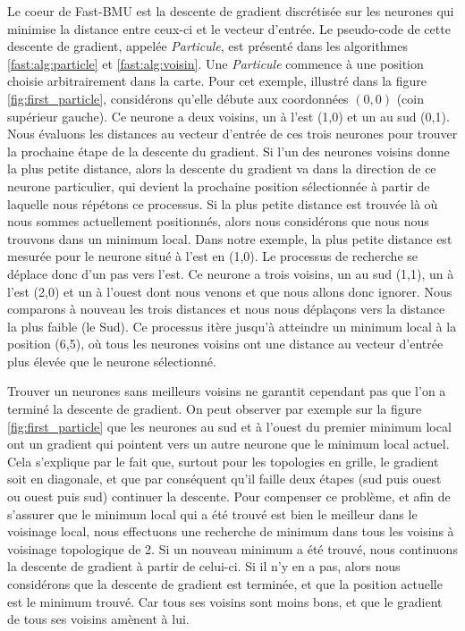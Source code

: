 	Le coeur de Fast-BMU est la descente de gradient discrétisée sur les neurones qui minimise la distance entre ceux-ci et le vecteur d'entrée. Le pseudo-code de cette descente de gradient, appelée \textit{Particule}, est présenté dans les algorithmes \ref{fast:alg:particle} et \ref{fast:alg:voisin}. Une \textit{Particule} commence à une position choisie arbitrairement dans la carte. Pour cet exemple, illustré dans la figure \ref{fig:first_particle}, considérons qu'elle débute aux coordonnées $(0,0)$ (coin supérieur gauche). Ce neurone a deux voisins, un à l'est (1,0) et un au sud (0,1). Nous évaluons les distances au vecteur d'entrée de ces trois neurones pour trouver la prochaine étape de la descente du gradient. Si l'un des neurones voisins donne la plus petite distance, alors la descente du gradient va dans la direction de ce neurone particulier, qui devient la prochaine position sélectionnée à partir de laquelle nous répétons ce processus. Si la plus petite distance est trouvée là où nous sommes actuellement positionnés, alors nous considérons que nous nous trouvons dans un minimum local. Dans notre exemple, la plus petite distance est mesurée pour le neurone situé à l'est en (1,0). Le processus de recherche se déplace donc d'un pas vers l'est. Ce neurone a trois voisins, un au sud (1,1), un à l'est (2,0) et un à l'ouest dont nous venons et que nous allons donc ignorer. Nous comparons à nouveau les trois distances et nous nous déplaçons vers la distance la plus faible (le Sud). Ce processus itère jusqu'à atteindre un minimum local à la position (6,5), où tous les neurones voisins ont une distance au vecteur d'entrée plus élevée que le neurone sélectionné.

	Trouver un neurones sans meilleurs voisins ne garantit cependant pas que l'on a terminé la descente de gradient. On peut observer par exemple sur la figure \ref{fig:first_particle} que les neurones au sud et à l'ouest du premier minimum local ont un gradient qui pointent vers un autre neurone que le minimum local actuel. Cela s'explique par le fait que, surtout pour les topologies en grille, le gradient soit en diagonale, et que par conséquent qu'il faille deux étapes (sud puis ouest ou ouest puis sud) continuer la descente. Pour compenser ce problème, et afin de s'assurer que le minimum local qui a été trouvé est bien le meilleur dans le voisinage local, nous effectuons une recherche de minimum dans tous les voisins à voisinage topologique de 2. Si un nouveau minimum a été trouvé, nous continuons la descente de gradient à partir de celui-ci. Si il n'y en a pas, alors nous considérons que la descente de gradient est terminée, et que la position actuelle est le minimum trouvé. Car tous ses voisins sont moins bons, et que le gradient de tous ses voisins amènent à lui.

